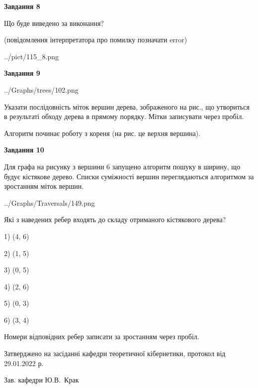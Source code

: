 \documentclass[12pt, ukrainian]{article}
\begin{document}
{\begin {large}
{\begin {center}\textbf{Завдання 8}\end {center}}\par
Що буде виведено за виконання?\par
 (повідомлення інтерпретатора про помилку позначати error)\par
\begin{center}
	{../pict/115_8.png}
\end{center}
\newpage

{\begin {center}\textbf{Завдання 9}\end {center}}\par

\begin{center}
	{../Graphs/trees/102.png}
\end{center}
Указати послідовність міток вершин дерева, зображеного на рис., що утвориться в результаті обходу дерева в прямому порядку. Мітки записувати через пробіл.\par Алгоритм починає роботу з кореня (на рис. це верхня вершина).\par
\newpage

{\begin {center}\textbf{Завдання 10}\end {center}}\par
Для графа на рисунку з вершини 6 запущено алгоритм пошуку в ширину, що будує кістякове дерево. Списки суміжності вершин переглядаються алгоритмом за зростанням міток вершин.\par
\begin{center}
	{../Graphs/Traversals/149.png}
\end{center}
\par Які з наведених ребер входять до складу отриманого кістякового дерева?\par
1) (4, 6)\par
2) (1, 5)\par
3) (0, 5)\par
4) (2, 6)\par
5) (0, 3)\par
6) (3, 4)\par
{\vskip 15pt} Номери відповідних ребер записати за зростанням через пробіл.\par
\newpage


\end {large}
}
{\smallskip \begin {small} Затверджено на засіданні кафедри теоретичної кібернетики, протокол  від   29.01.2022 р.\par\smallskip\smallskip
{\parbox {6.5 cm}{Зав. кафедри \dotfill Ю.В.~Крак}} \end{small}}
\end{document}

